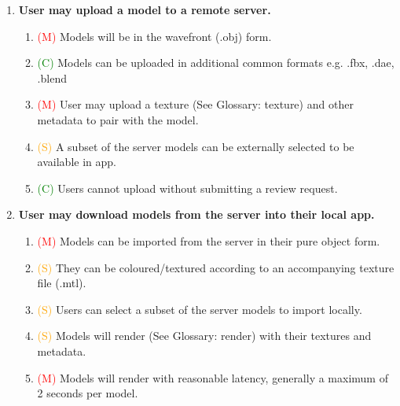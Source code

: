 \documentclass[12pt, a4paper]{article}
\newcommand{\must}[1]{\textcolor{red}{#1}}
\newcommand{\should}[1]{\textcolor{orange}{#1}}
\newcommand{\could}[1]{\textcolor{green}{#1}}
\begin{document}
\newpage
\begin{enumerate}[label=\Roman*.]
\item \textbf{User may upload a model to a remote server.}
    \begin{enumerate}[label=\arabic*.]
    \item \must{(M)} Models will be in the wavefront (.obj) form.
    \item \could{(C)} Models can be uploaded in additional common formats e.g. .fbx, .dae, .blend
    \item \must{(M)} User may upload a texture (See Glossary: \gls{texture}) and other metadata to pair with the model.
    \item \should{(S)} A subset of the server models can be externally selected to be available in app.
    \item \could{(C)} Users cannot upload without submitting a review request.
    \end{enumerate}
    
\item \textbf{User may download models from the server into their local app.}
    \begin{enumerate}[label=\arabic*.]
    \item \must{(M)} Models can be imported from the server in their pure object form.
    \item \should{(S)} They can be coloured/textured according to an accompanying texture file (.mtl).
    \item \should{(S)} Users can select a subset of the server models to import locally.
    \item \should{(S)} Models will render (See Glossary: \gls{render}) with their textures and metadata.
    \item \must{(M)} Models will render with reasonable latency, generally a maximum of 2 seconds per model.
    \end{enumerate}


\end{enumerate}
\end{document}

